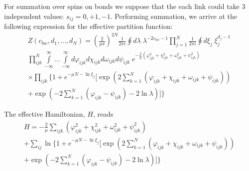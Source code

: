 \documentclass[aps,12pt]{revtex4}
\begin{document}
\begin{appendix}
For summation over spins on bonds we suppose that the each link could take 3 independent values: $s_{ij}=0,+1,-1$.  Performing summation, we arrive at the following expression for the effective partition function:
\begin{multline}
Z(c_{bw},d_1,...,d_N) = \left(\frac{2}{\mu\pi}\right)^{2N} \frac{1}{2\pi i} \oint d\lambda\; \lambda^{-2c_{bw}-1} \prod_{j=1}^N \frac{1}{2\pi i} \oint d\xi_j\; \xi_j^{d_j-1}  \\
\prod_{ijk}^N\int\limits_{-\infty}^{\infty}...\int\limits_{-\infty}^{\infty} d\varphi_{ijk} d\chi_{ijk} d\omega_{ijk} d\psi_{ijk}\; e^{-\frac{2}{\mu}\left(\varphi_{ijk}^2+ \chi^2_{ijk}+ \omega^2_{ijk}+\psi^2_{ijk}\right)} \\
\times \prod_{ijk} \Bigg\{1+e^{-\mu N-\ln \xi_j}\Bigg[\exp\left(2\sum_{k=1}^N\left(\varphi_{ijk}+\chi_{ijk}+\omega_{ijk}+
\psi_{ijk}\right)\right) \\ + \exp\left(-2\sum_{k=1}^N\left(\varphi_{ijk}-\psi_{ijk}\right)-2\ln
\lambda\right) \Bigg]\Bigg\}
\end{multline}

The effective Hamiltonian, $H$, reads
\begin{multline}
H=-\frac{2}{\mu} \sum_{ijk} \left(\varphi_{ijk}^2+ \chi^2_{ijk}+ \omega^2_{ijk}+\psi^2_{ijk} \right) \\
+ \sum_{ij}\ln\Bigg\{1+e^{-\mu N-\ln\xi_j}\Bigg[\exp\left(2\sum_{k=1}^N\left(\varphi_{ijk}+\chi_{ijk}+\omega_{ijk}+ \psi_{ijk}\right)\right) \\ + \exp\left(-2\sum_{k=1}^N\left(\varphi_{ijk}-\psi_{ijk}\right)-2\ln \lambda\right) \Bigg] \Bigg\}
\end{multline}


\end{appendix}
\end{document}
